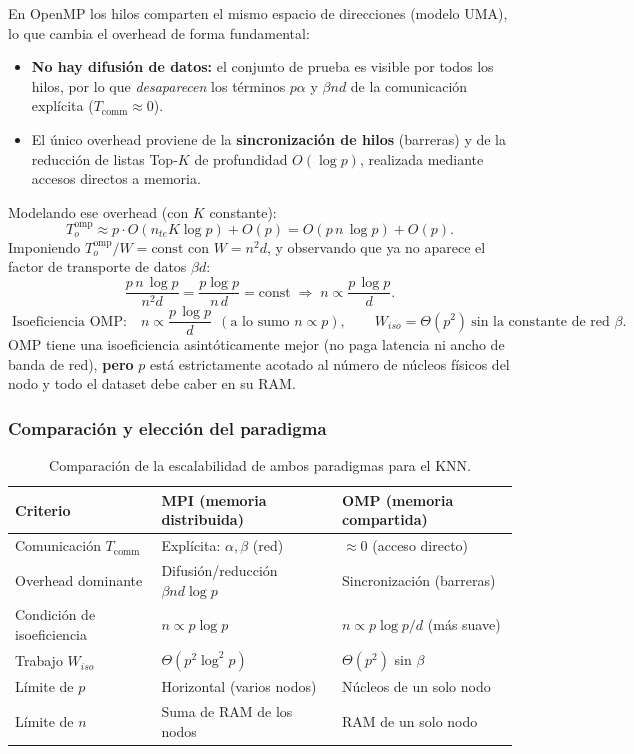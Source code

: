 En OpenMP los hilos comparten el mismo espacio de direcciones (modelo UMA), lo que cambia el
overhead de forma fundamental:
\begin{itemize}
    \item \textbf{No hay difusión de datos:} el conjunto de prueba es visible por todos los hilos,
    por lo que \emph{desaparecen} los términos $p\alpha$ y $\beta n d$ de la comunicación
    explícita ($T_{\text{comm}} \approx 0$).
    \item El único overhead proviene de la \textbf{sincronización de hilos} (barreras) y de la
    reducción de listas Top-$K$ de profundidad $O(\log p)$, realizada mediante accesos directos a
    memoria.
\end{itemize}
Modelando ese overhead (con $K$ constante):
\[
T_o^{\text{omp}} \approx p\cdot O(n_{te}K\log p) + O(p)
= O(p\,n\,\log p) + O(p).
\]
Imponiendo $T_o^{\text{omp}}/W=\text{const}$ con $W=n^2 d$, y observando que ya no aparece el
factor de transporte de datos $\beta d$:
\[
\frac{p\,n\,\log p}{n^2 d}=\frac{p\log p}{n\,d}=\text{const}
\;\Rightarrow\;
n \propto \frac{p\,\log p}{d}.
\]
\[
\boxed{\;
\text{Isoeficiencia OMP:}\quad n \propto \frac{p\,\log p}{d}\ \ (\text{a lo sumo } n\propto p),
\qquad
W_{iso} = \Theta(p^2)\ \text{sin la constante de red } \beta.
\;}
\]
OMP tiene una isoeficiencia asintóticamente mejor (no paga latencia ni ancho de banda de red),
\textbf{pero} $p$ está estrictamente acotado al número de núcleos físicos del nodo y todo el
dataset debe caber en su RAM.

\subsubsection{Comparación y elección del paradigma}

\begin{table}[H]
\centering
\begin{tabular}{lll}
\toprule
Criterio & MPI (memoria distribuida) & OMP (memoria compartida) \\
\midrule
Comunicación $T_{\text{comm}}$ & Explícita: $\alpha,\beta$ (red) & $\approx 0$ (acceso directo) \\
Overhead dominante & Difusión/reducción $\beta n d\log p$ & Sincronización (barreras) \\
Condición de isoeficiencia & $n \propto p\log p$ & $n \propto p\log p / d$ (más suave) \\
Trabajo $W_{iso}$ & $\Theta(p^2\log^2 p)$ & $\Theta(p^2)$ sin $\beta$ \\
Límite de $p$ & Horizontal (varios nodos) & Núcleos de un solo nodo \\
Límite de $n$ & Suma de RAM de los nodos & RAM de un solo nodo \\
\bottomrule
\end{tabular}
\caption{Comparación de la escalabilidad de ambos paradigmas para el KNN.}
\label{tab:iso-comparacion}
\end{table}

